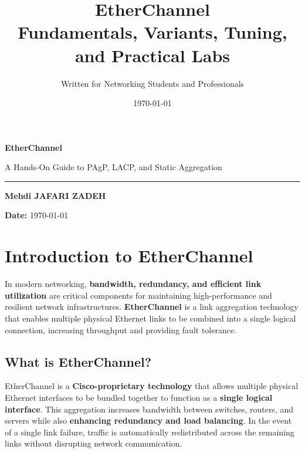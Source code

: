 \documentclass[a4paper]{article}
\title{\Huge \textbf{EtherChannel}\\
       \Large Fundamentals, Variants, Tuning, and Practical Labs}
\author{\Large Written for Networking Students and Professionals}
\date{\today}
\begin{document}
\begin{titlepage}

	\centering
	\vspace*{4cm}
	{\Huge \textbf{EtherChannel}\par}
	\vspace{0.8cm}
	{\Large A Hands-On Guide to PAgP, LACP, and Static Aggregation\par}
	\vspace{0.3cm}
	\rule{0.9\textwidth}{1pt}

	\vspace{0.6cm}
	{\large \textbf{Mehdi JAFARI ZADEH}}\par
	\vspace{0.3cm}
	\centering
	\vspace*{4cm}

	\vfill
	\textbf{Date:} \today
	\vspace{2cm}
\end{titlepage}

\tableofcontents
\newpage
\section{Introduction to EtherChannel}
In modern networking, \textbf{bandwidth, redundancy, and efficient link utilization} are critical components for maintaining high-performance and resilient network infrastructures. \textbf{EtherChannel} is a link aggregation technology that enables multiple physical Ethernet links to be combined into a single logical connection, increasing throughput and providing fault tolerance.

\subsection{What is EtherChannel?}
EtherChannel is a \textbf{Cisco-proprietary technology} that allows multiple physical Ethernet interfaces to be bundled together to function as a \textbf{single logical interface}. This aggregation increases bandwidth between switches, routers, and servers while also \textbf{enhancing redundancy and load balancing}. In the event of a single link failure, traffic is automatically redistributed across the remaining links without disrupting network communication.
\end{document}
